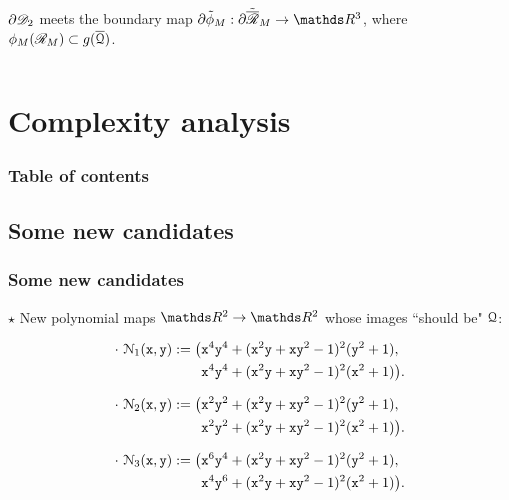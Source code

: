 \documentclass{beamer}
\begin{document}
\begin{frame}
\begin{columns}
\begin{column}{0.5\textwidth}
\begin{center}
\end{center}
\vspace{-0.6cm}
\begin{center}
$\partial\mathscr{D}_2$ meets the boundary map $\partial\tilde{\phi}_M:\partial\tilde{\overline{\Rr}}_M\rightarrow\R^3$, where $\phi_M(\mathscr{R}_M) \subset g(\overline{\mathcal{Q}})$.
\end{center}
\end{column}
\end{columns}

\end{frame}

\section{Complexity analysis}
\begin{frame}
\frametitle{Table of contents}
\tableofcontents[currentsection]
\end{frame} 

\subsection{Some new candidates}
\begin{frame}
\frametitle{Some new candidates}
$\star$ New polynomial maps $\R^2\to\R^2$ whose images ``should be" $\mathcal{Q}$:

\begin{align*}
\cdot\ \mathcal{N}_1(\x,\y):=\big(&\x^4\y^4+(\x^2\y+\x\y^2-1)^2(\y^2+1),\\
&\x^4\y^4+(\x^2\y+\x\y^2-1)^2(\x^2+1)\big).
\end{align*}

\begin{align*}
\cdot\ \mathcal{N}_2(\x,\y):=\big(&\x^2\y^2+(\x^2\y+\x\y^2-1)^2(\y^2+1),\\
&\x^2\y^2+(\x^2\y+\x\y^2-1)^2(\x^2+1)\big).
\end{align*}

\begin{align*}
\cdot\ \mathcal{N}_3(\x,\y):=\big(&\x^6\y^4+(\x^2\y+\x\y^2-1)^2(\y^2+1),\\
&\x^4\y^6+(\x^2\y+\x\y^2-1)^2(\x^2+1)\big).
\end{align*}

\end{frame}
\end{document}
